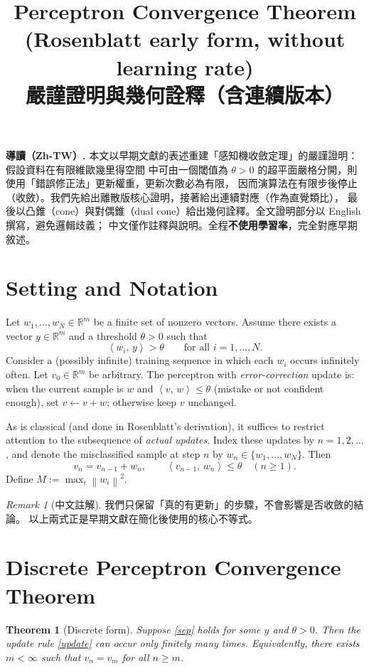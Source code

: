 \documentclass[11pt]{article}
\title{\textbf{Perceptron Convergence Theorem}\\
\large (Rosenblatt early form, without learning rate)\\
\normalsize 嚴謹證明與幾何詮釋（含連續版本）}
\author{ }
\date{ }
\newtheorem{theorem}{Theorem}
\theoremstyle{remark}
\newtheorem{remark}{Remark}
\newcommand{\inner}[2]{\left\langle #1,\, #2 \right\rangle}
\newcommand{\norm}[1]{\left\lVert #1 \right\rVert}
\newcommand{\R}{\mathbb{R}}
\begin{document}
\maketitle

\noindent\textbf{導讀（Zh-TW）.}
本文以早期文獻的表述重建「感知機收斂定理」的嚴謹證明：假設資料在有限維歐幾里得空間
中可由一個閾值為 \(\theta>0\) 的超平面嚴格分開，則使用「錯誤修正法」更新權重，更新次數必為有限，
因而演算法在有限步後停止（收斂）。我們先給出離散版核心證明，接著給出連續對應（作為直覺類比），
最後以凸錐（cone）與對偶錐（dual cone）給出幾何詮釋。全文證明部分以 English 撰寫，避免邏輯歧義；
中文僅作註釋與說明。全程\textbf{不使用學習率}，完全對應早期敘述。

\section{Setting and Notation}
Let \(w_1,\dots,w_N\in\R^m\) be a finite set of nonzero vectors. Assume there exists
a vector \(y\in\R^m\) and a threshold \(\theta>0\) such that
\begin{equation}\label{sep}
  \inner{w_i}{y}>\theta \qquad\text{for all } i=1,\dots,N.
\end{equation}
Consider a (possibly infinite) training sequence in which each \(w_i\) occurs infinitely often.
Let \(v_0\in\R^m\) be arbitrary. The perceptron with \emph{error-correction} update is:
when the current sample is \(w\) and \(\inner{v}{w}\le\theta\) (mistake or not confident enough),
set \(v\gets v+w\); otherwise keep \(v\) unchanged.

As is classical (and done in Rosenblatt's derivation), it suffices to restrict attention to the
subsequence of \emph{actual updates}. Index these updates by \(n=1,2,\dots\), and denote the
misclassified sample at step \(n\) by \(w_n\in\{w_1,\dots,w_N\}\). Then
\begin{equation}\label{update}
  v_n = v_{n-1}+w_n,\qquad \inner{v_{n-1}}{w_n}\le \theta \quad (n\ge1).
\end{equation}
Define \(M:=\max_i \norm{w_i}^2\).

\begin{remark}[中文註解]
我們只保留「真的有更新」的步驟，不會影響是否收斂的結論。
以上兩式正是早期文獻在簡化後使用的核心不等式。
\end{remark}

\section{Discrete Perceptron Convergence Theorem}
\begin{theorem}[Discrete form]\label{thm:discrete}
Suppose \eqref{sep} holds for some \(y\) and \(\theta>0\).
Then the update rule \eqref{update} can occur only finitely many times.
Equivalently, there exists \(m<\infty\) such that \(v_n=v_m\) for all \(n\ge m\).
\end{theorem}
\end{document}
